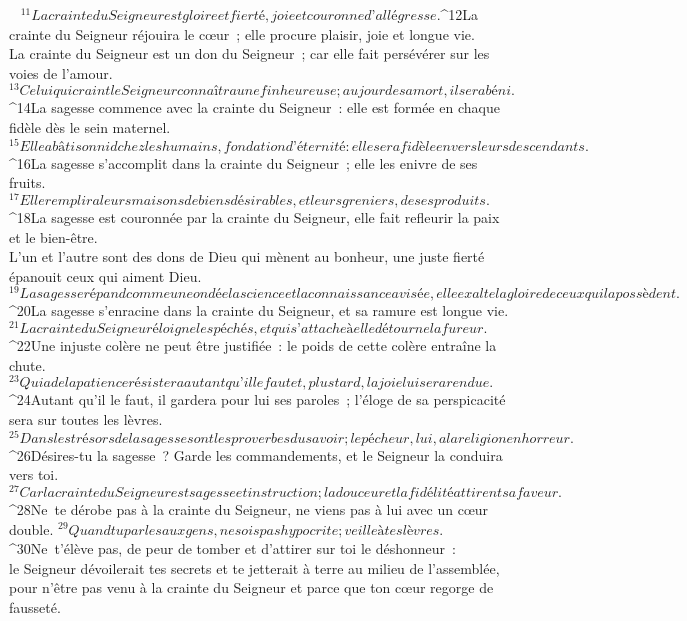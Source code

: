            
${}^{11}La crainte du Seigneur est gloire et fierté,
        joie et couronne d’allégresse.
${}^{12}La crainte du Seigneur réjouira le cœur ;
        elle procure plaisir, joie et longue vie.
        \\La crainte du Seigneur est un don du Seigneur ;
        car elle fait persévérer sur les voies de l’amour.
${}^{13}Celui qui craint le Seigneur connaîtra une fin heureuse ;
        au jour de sa mort, il sera béni.
         
${}^{14}La sagesse commence avec la crainte du Seigneur :
        elle est formée en chaque fidèle dès le sein maternel.
${}^{15}Elle a bâti son nid chez les humains, fondation d’éternité :
        elle sera fidèle envers leurs descendants.
         
${}^{16}La sagesse s’accomplit dans la crainte du Seigneur ;
        elle les enivre de ses fruits.
${}^{17}Elle remplira leurs maisons de biens désirables,
        et leurs greniers, de ses produits.
         
${}^{18}La sagesse est couronnée par la crainte du Seigneur,
        elle fait refleurir la paix et le bien-être.
        \\L’un et l’autre sont des dons de Dieu qui mènent au bonheur,
        une juste fierté épanouit ceux qui aiment Dieu.
         
${}^{19}La sagesse répand comme une ondée la science et la connaissance avisée,
        elle exalte la gloire de ceux qui la possèdent.
${}^{20}La sagesse s’enracine dans la crainte du Seigneur,
        et sa ramure est longue vie.
${}^{21}La crainte du Seigneur éloigne les péchés,
        et qui s’attache à elle détourne la fureur.
${}^{22}Une injuste colère ne peut être justifiée :
        le poids de cette colère entraîne la chute.
${}^{23}Qui a de la patience résistera autant qu’il le faut
        et, plus tard, la joie lui sera rendue.
${}^{24}Autant qu’il le faut, il gardera pour lui ses paroles ;
        l’éloge de sa perspicacité sera sur toutes les lèvres.
         
${}^{25}Dans les trésors de la sagesse sont les proverbes du savoir ;
        le pécheur, lui, a la religion en horreur.
${}^{26}Désires-tu la sagesse ? Garde les commandements,
        et le Seigneur la conduira vers toi.
${}^{27}Car la crainte du Seigneur est sagesse et instruction ;
        la douceur et la fidélité attirent sa faveur.
         
${}^{28}Ne te dérobe pas à la crainte du Seigneur,
        ne viens pas à lui avec un cœur double.
${}^{29}Quand tu parles aux gens, ne sois pas hypocrite ;
        veille à tes lèvres.
${}^{30}Ne t’élève pas, de peur de tomber
        et d’attirer sur toi le déshonneur :
        \\le Seigneur dévoilerait tes secrets
        et te jetterait à terre au milieu de l’assemblée,
        \\pour n’être pas venu à la crainte du Seigneur
        et parce que ton cœur regorge de fausseté.
      
